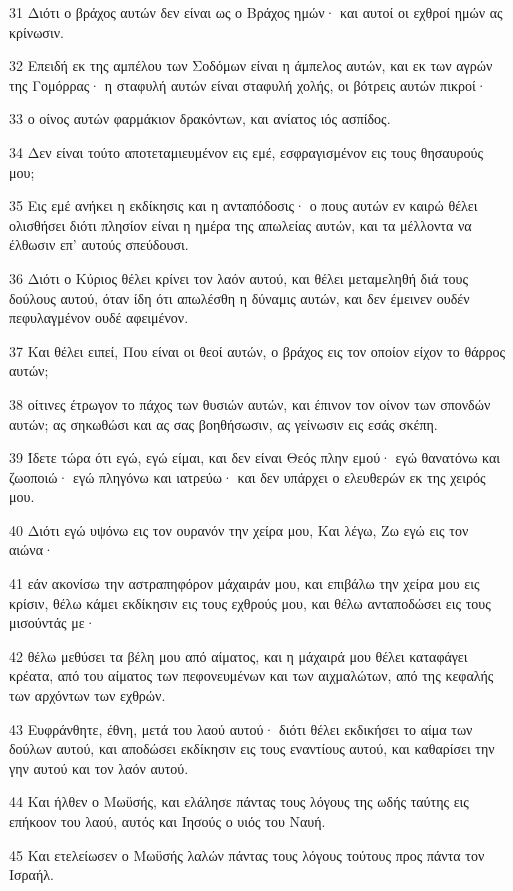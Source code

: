 \par 31 Διότι ο βράχος αυτών δεν είναι ως ο Βράχος ημών· και αυτοί οι εχθροί ημών ας κρίνωσιν.
\par 32 Επειδή εκ της αμπέλου των Σοδόμων είναι η άμπελος αυτών, και εκ των αγρών της Γομόρρας· η σταφυλή αυτών είναι σταφυλή χολής, οι βότρεις αυτών πικροί·
\par 33 ο οίνος αυτών φαρμάκιον δρακόντων, και ανίατος ιός ασπίδος.
\par 34 Δεν είναι τούτο αποτεταμιευμένον εις εμέ, εσφραγισμένον εις τους θησαυρούς μου;
\par 35 Εις εμέ ανήκει η εκδίκησις και η ανταπόδοσις· ο πους αυτών εν καιρώ θέλει ολισθήσει διότι πλησίον είναι η ημέρα της απωλείας αυτών, και τα μέλλοντα να έλθωσιν επ' αυτούς σπεύδουσι.
\par 36 Διότι ο Κύριος θέλει κρίνει τον λαόν αυτού, και θέλει μεταμεληθή διά τους δούλους αυτού, όταν ίδη ότι απωλέσθη η δύναμις αυτών, και δεν έμεινεν ουδέν πεφυλαγμένον ουδέ αφειμένον.
\par 37 Και θέλει ειπεί, Που είναι οι θεοί αυτών, ο βράχος εις τον οποίον είχον το θάρρος αυτών;
\par 38 οίτινες έτρωγον το πάχος των θυσιών αυτών, και έπινον τον οίνον των σπονδών αυτών; ας σηκωθώσι και ας σας βοηθήσωσιν, ας γείνωσιν εις εσάς σκέπη.
\par 39 Ίδετε τώρα ότι εγώ, εγώ είμαι, και δεν είναι Θεός πλην εμού· εγώ θανατόνω και ζωοποιώ· εγώ πληγόνω και ιατρεύω· και δεν υπάρχει ο ελευθερών εκ της χειρός μου.
\par 40 Διότι εγώ υψόνω εις τον ουρανόν την χείρα μου, Και λέγω, Ζω εγώ εις τον αιώνα·
\par 41 εάν ακονίσω την αστραπηφόρον μάχαιράν μου, και επιβάλω την χείρα μου εις κρίσιν, θέλω κάμει εκδίκησιν εις τους εχθρούς μου, και θέλω ανταποδώσει εις τους μισούντάς με·
\par 42 θέλω μεθύσει τα βέλη μου από αίματος, και η μάχαιρά μου θέλει καταφάγει κρέατα, από του αίματος των πεφονευμένων και των αιχμαλώτων, από της κεφαλής των αρχόντων των εχθρών.
\par 43 Ευφράνθητε, έθνη, μετά του λαού αυτού· διότι θέλει εκδικήσει το αίμα των δούλων αυτού, και αποδώσει εκδίκησιν εις τους εναντίους αυτού, και καθαρίσει την γην αυτού και τον λαόν αυτού.
\par 44 Και ήλθεν ο Μωϋσής, και ελάλησε πάντας τους λόγους της ωδής ταύτης εις επήκοον του λαού, αυτός και Ιησούς ο υιός του Ναυή.
\par 45 Και ετελείωσεν ο Μωϋσής λαλών πάντας τους λόγους τούτους προς πάντα τον Ισραήλ.
